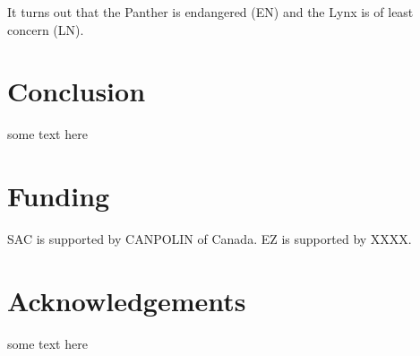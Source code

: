 \documentclass[letterpaper,superscriptaddress,showkeys,longbibliography]{revtex4-1}\usepackage{graphicx, color}
\begin{document}
It turns out that the Panther is endangered (EN) and the Lynx is of least concern (LN). 

\section{Conclusion}

some text here

\section{Funding}

SAC is supported by CANPOLIN of Canada. EZ is supported by XXXX.

\section{Acknowledgements}

some text here

\newpage

\end{document}
